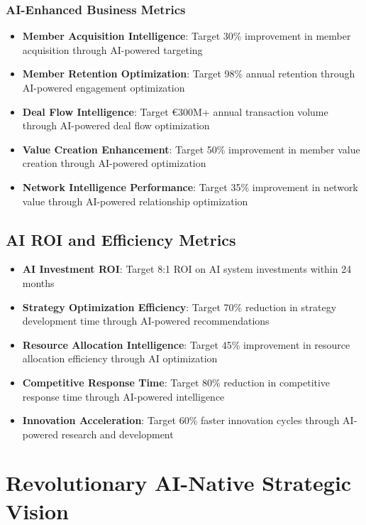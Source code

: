 \subsubsection{AI-Enhanced Business Metrics}

\begin{itemize}
    \item \textbf{Member Acquisition Intelligence}: Target 30\% improvement in member acquisition through AI-powered targeting
    \item \textbf{Member Retention Optimization}: Target 98\% annual retention through AI-powered engagement optimization
    \item \textbf{Deal Flow Intelligence}: Target €300M+ annual transaction volume through AI-powered deal flow optimization
    \item \textbf{Value Creation Enhancement}: Target 50\% improvement in member value creation through AI-powered optimization
    \item \textbf{Network Intelligence Performance}: Target 35\% improvement in network value through AI-powered relationship optimization
\end{itemize}

\subsection{AI ROI and Efficiency Metrics}

\begin{itemize}
    \item \textbf{AI Investment ROI}: Target 8:1 ROI on AI system investments within 24 months
    \item \textbf{Strategy Optimization Efficiency}: Target 70\% reduction in strategy development time through AI-powered recommendations
    \item \textbf{Resource Allocation Intelligence}: Target 45\% improvement in resource allocation efficiency through AI optimization
    \item \textbf{Competitive Response Time}: Target 80\% reduction in competitive response time through AI-powered intelligence
    \item \textbf{Innovation Acceleration}: Target 60\% faster innovation cycles through AI-powered research and development
\end{itemize}

\section{Revolutionary AI-Native Strategic Vision}

